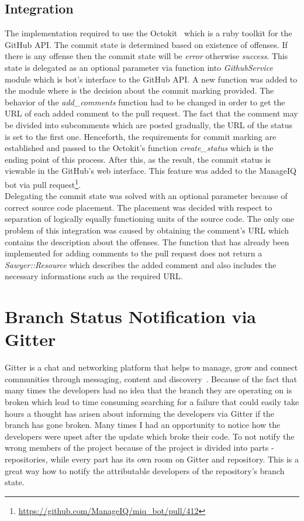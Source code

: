 \subsection{Integration}

The implementation required to use the Octokit~\cite{OCTOKIT} which is a ruby toolkit for the GitHub API. The commit state is determined based on existence of offenses. If there is any offense then the commit state will be \textit{error} otherwise \textit{success}. This state is delegated as an optional parameter via function into \textit{GithubService} module which is bot's interface to the GitHub API. A new function was added to the module where is the decision about the commit marking provided. The behavior of the \textit{add\_comments} function had to be changed in order to get the URL of each added comment to the pull request. The fact that the comment may be divided into subcomments which are posted gradually, the URL of the status is set to the first one. Henceforth, the requirements for commit marking are established and passed to the Octokit's function \textit{create\_status} which is the ending point of this process. After this, as the result, the commit status is viewable in the GitHub's web interface. This feature was added to the ManageIQ bot via pull request\footnote{\url{https://github.com/ManageIQ/miq_bot/pull/412}}.\\

Delegating the commit state was solved with an optional parameter because of correct source code placement. The placement was decided with respect to separation of logically equally functioning units of the source code. The only one problem of this integration was caused by obtaining the comment's URL which contains the description about the offenses. The function that has already been implemented for adding comments to the pull request does not return a \textit{Sawyer::Resource} which describes the added comment and also includes the necessary informations such as the required URL.

\section{Branch Status Notification via Gitter}

Gitter is a chat and networking platform that helps to manage, grow and connect communities through messaging, content and discovery~\cite{GITTER}. Because of the fact that many times the developers had no idea that the branch they are operating on is broken which lead to time consuming searching for a failure that could easily take hours a thought has arisen about informing the developers via Gitter if the branch has gone broken. Many times I had an opportunity to notice how the developers were upset after the update which broke their code. To not notify the wrong members of the project because of the project is divided into parts - repositories, while every part has its own room on Gitter and repository. This is a great way how to notify the attributable developers of the repository's branch state.

